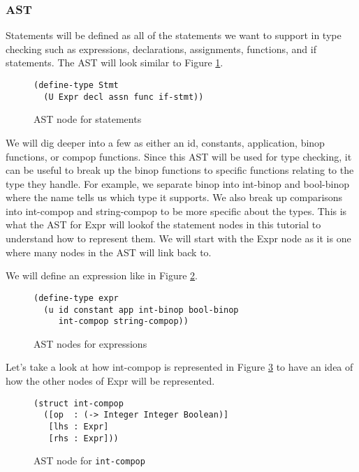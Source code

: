 \subsubsection{AST}
Statements will be defined as all of the statements we want to support in type checking such as expressions, declarations, assignments, functions, and if statements. The AST will look similar to Figure \ref{fig:ast-stmt}.

\begin{figure}[h]
    \begin{lstlisting}[language=racket]
(define-type Stmt
  (U Expr decl assn func if-stmt))
    \end{lstlisting}
    \caption[]{AST node for statements}
    \label{fig:ast-stmt}
\end{figure}

We will dig deeper into a few  as either an id, constants, application, binop functions, or compop functions. Since this AST will be used for type checking, it can be useful to break up the binop functions to specific functions relating to the type they handle. For example, we separate binop into int-binop and bool-binop where the name tells us which type it supports. We also break up comparisons into int-compop and string-compop to be more specific about the types. This is what the AST for Expr will lookof the statement nodes in this tutorial to understand how to represent them. We will start with the Expr node as it is one where many nodes in the AST will link back to.

We will define an expression like in Figure \ref{fig:ast-expr}.

\begin{figure}[h]
    \begin{lstlisting}[language=racket]
(define-type expr
  (u id constant app int-binop bool-binop
     int-compop string-compop))
    \end{lstlisting}
    \caption[]{AST nodes for expressions}
    \label{fig:ast-expr}
\end{figure}

Let's take a look at how int-compop is represented in Figure \ref{fig:ast-compop} to have an idea of how the other nodes of Expr will be represented.

\begin{figure}[h]
    \begin{lstlisting}[language=racket]
(struct int-compop
  ([op  : (-> Integer Integer Boolean)]
   [lhs : Expr]
   [rhs : Expr]))
    \end{lstlisting}
    \caption[]{AST node for {\tt int-compop}}
    \label{fig:ast-compop}
\end{figure}

